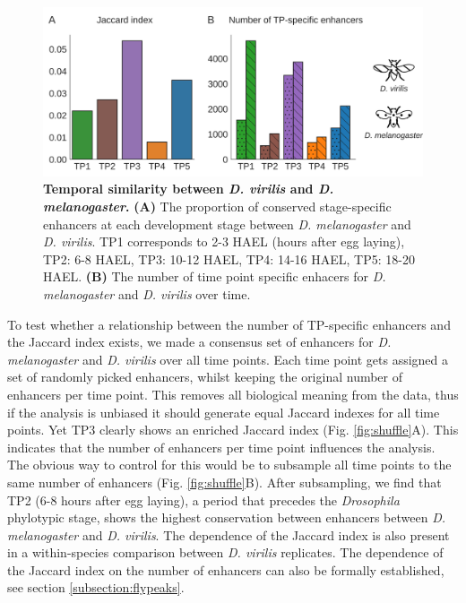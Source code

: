 \begin{figure}
    \includegraphics[width=\linewidth]{ch.hourglass/images/enhancers_between.png}
    \caption{\textbf{Temporal similarity between \textit{D. virilis} and \textit{D. melanogaster}.} \textbf{(A)} The proportion of conserved stage-specific enhancers at each development stage between \textit{D. melanogaster} and \textit{D. virilis}. TP1 corresponds to 2-3 HAEL (hours after egg laying), TP2: 6-8 HAEL, TP3: 10-12 HAEL, TP4: 14-16 HAEL, TP5: 18-20 HAEL. \textbf{(B)} The number of time point specific enhacers for \textit{D. melanogaster} and \textit{D. virilis} over time. }
    \label{fig:peak_between}
\end{figure}

To test whether a relationship between the number of TP-specific enhancers and the Jaccard index exists, we made a consensus set of enhancers for \textit{D. melanogaster} and \textit{D. virilis} over all time points. Each time point gets assigned a set of randomly picked enhancers, whilst keeping the original number of enhancers per time point. This removes all biological meaning from the data, thus if the analysis is unbiased it should generate equal Jaccard indexes for all time points. Yet TP3 clearly shows an enriched Jaccard index (Fig. \ref{fig:shuffle}A). This indicates that the number of enhancers per time point influences the analysis. The obvious way to control for this would be to subsample all time points to the same number of enhancers (Fig. \ref{fig:shuffle}B). After subsampling, we find that TP2 (6-8 hours after egg laying), a period that precedes the \textit{Drosophila} phylotypic stage\cite{Kalinka2010,Liu2020}, shows the highest conservation between enhancers between \textit{D. melanogaster} and \textit{D. virilis}. The dependence of the Jaccard index is also present in a within-species comparison between \textit{D. virilis} replicates. The dependence of the Jaccard index on the number of enhancers can also be formally established, see section \ref{subsection:flypeaks}.

